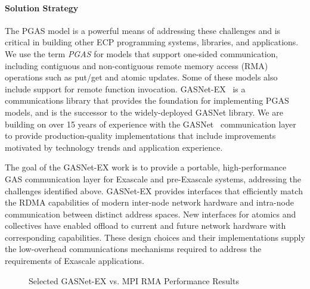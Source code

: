 \paragraph{Solution Strategy}

The PGAS model is a powerful means of addressing these
challenges and is critical in building other ECP programming systems,
libraries, and applications.  We use the term {\em PGAS} for models that support
one-sided communication, 
including contiguous and non-contiguous remote memory access (RMA) operations such as put/get
and atomic updates. Some of these models also include support for remote function invocation.
GASNet-EX~\cite{gasnet-lcpc18} is a communications library that provides the foundation for implementing
PGAS models, and is the successor to the widely-deployed GASNet library.
We are building on over 15 years of experience with the GASNet~\cite{gasnet-spec,gasnet-site}
communication layer to provide production-quality implementations that include
improvements motivated by
technology trends and application experience.  

The goal of the GASNet-EX work is to provide a portable, high-performance GAS
communication layer for Exascale and pre-Exascale systems, addressing the challenges
identified above.
GASNet-EX provides interfaces that efficiently match the RDMA capabilities of modern
inter-node network hardware and intra-node communication between distinct address spaces.
New interfaces for atomics and collectives have enabled offload to current
and future network hardware with corresponding capabilities.
These design choices and their implementations supply the low-overhead communications
mechanisms required to address the requirements of Exascale applications.

\begin{figure}[htb]
  \centering
  \caption{\label{fig:gasnet-ex-rma} Selected GASNet-EX vs. MPI RMA Performance Results}
\end{figure}

